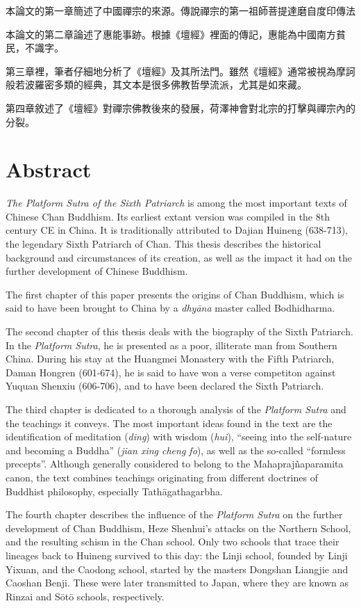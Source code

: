 本論文的第一章簡述了中國禪宗的來源。傳說禪宗的第一祖師菩提達磨自度印傳法

本論文的第二章論述了惠能事跡。根據《壇經》裡面的傳記，惠能為中國南方貧民，不識字。

第三章裡，筆者仔細地分析了《壇經》及其所法門。雖然《壇經》通常被視為摩訶般若波羅密多類的經典，其文本是很多佛教哲學流派，尤其是如來藏。

第四章敘述了《壇經》對禪宗佛教後來的發展，荷澤神會對北宗的打擊與禪宗內的分裂。

\chapter*{Abstract}
\textit{The Platform Sutra of the Sixth Patriarch} is among the most important texts of Chinese Chan Buddhism.
Its earliest extant version was compiled in the 8th century CE in China.
It is traditionally attributed to Dajian Huineng (638-713), the legendary Sixth Patriarch of Chan.
This thesis describes the historical background and circumstances of its creation, as well as the impact it had on the further development of Chinese Buddhism.

The first chapter of this paper presents the origins of Chan Buddhism, which is said to have been brought to China by a \textit{dhyāna} master called Bodhidharma.

The second chapter of this thesis deals with the biography of the Sixth Patriarch.
In the \textit{Platform Sutra}, he is presented as a poor, illiterate man from Southern China.
During his stay at the Huangmei Monastery with the Fifth Patriarch, Daman Hongren (601-674), he is said to have won a verse competiton against Yuquan Shenxiu (606-706), and to have been declared the Sixth Patriarch.

The third chapter is dedicated to a thorough analysis of the \textit{Platform Sutra} and the teachings it conveys.
The most important ideas found in the text are the identification of meditation (\textit{ding}) with wisdom (\textit{hui}), ``seeing into the self-nature and becoming a Buddha'' (\textit{jian xing cheng fo}), as well as the so-called ``formless precepts''.
Although generally considered to belong to the Mahaprajñaparamita canon, the text combines teachings originating from different doctrines of Buddhist philosophy, especially Tathāgathagarbha.

The fourth chapter describes the influence of the \textit{Platform Sutra} on the further development of Chan Buddhism, Heze Shenhui's attacks on the Northern School, and the resulting schism in the Chan school.
Only two schools that trace their lineages back to Huineng survived to this day: the Linji school, founded by Linji Yixuan, and the Caodong school, started by the masters Dongshan Liangjie and Caoshan Benji.
These were later transmitted to Japan, where they are known as Rinzai and Sōtō schools, respectively.
